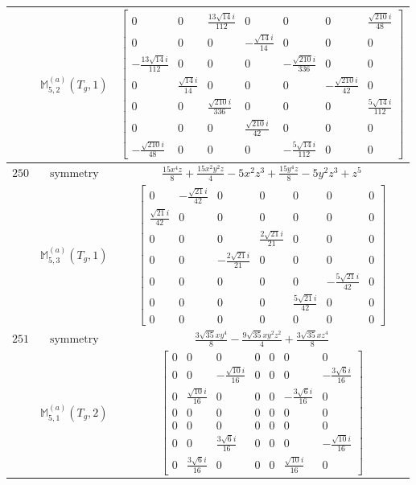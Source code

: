 \documentclass[fleqn,8pt,landscape]{jsarticle}
\begin{document}
\begin{longtable}{ccc}
$  $ & $ \mathbb{M}_{5,2}^{(a)}(T_{g},1) $ & $ \begin{bmatrix} 0 & 0 & \frac{13 \sqrt{14} i}{112} & 0 & 0 & 0 & \frac{\sqrt{210} i}{48} \\ 0 & 0 & 0 & - \frac{\sqrt{14} i}{14} & 0 & 0 & 0 \\ - \frac{13 \sqrt{14} i}{112} & 0 & 0 & 0 & - \frac{\sqrt{210} i}{336} & 0 & 0 \\ 0 & \frac{\sqrt{14} i}{14} & 0 & 0 & 0 & - \frac{\sqrt{210} i}{42} & 0 \\ 0 & 0 & \frac{\sqrt{210} i}{336} & 0 & 0 & 0 & \frac{5 \sqrt{14} i}{112} \\ 0 & 0 & 0 & \frac{\sqrt{210} i}{42} & 0 & 0 & 0 \\ - \frac{\sqrt{210} i}{48} & 0 & 0 & 0 & - \frac{5 \sqrt{14} i}{112} & 0 & 0 \end{bmatrix} $ \\ \hline
$ 250 $ & $ \text{symmetry} $ & $ \frac{15 x^{4} z}{8} + \frac{15 x^{2} y^{2} z}{4} - 5 x^{2} z^{3} + \frac{15 y^{4} z}{8} - 5 y^{2} z^{3} + z^{5} $ \\
$  $ & $ \mathbb{M}_{5,3}^{(a)}(T_{g},1) $ & $ \begin{bmatrix} 0 & - \frac{\sqrt{21} i}{42} & 0 & 0 & 0 & 0 & 0 \\ \frac{\sqrt{21} i}{42} & 0 & 0 & 0 & 0 & 0 & 0 \\ 0 & 0 & 0 & \frac{2 \sqrt{21} i}{21} & 0 & 0 & 0 \\ 0 & 0 & - \frac{2 \sqrt{21} i}{21} & 0 & 0 & 0 & 0 \\ 0 & 0 & 0 & 0 & 0 & - \frac{5 \sqrt{21} i}{42} & 0 \\ 0 & 0 & 0 & 0 & \frac{5 \sqrt{21} i}{42} & 0 & 0 \\ 0 & 0 & 0 & 0 & 0 & 0 & 0 \end{bmatrix} $ \\ \hline
$ 251 $ & $ \text{symmetry} $ & $ \frac{3 \sqrt{35} x y^{4}}{8} - \frac{9 \sqrt{35} x y^{2} z^{2}}{4} + \frac{3 \sqrt{35} x z^{4}}{8} $ \\
$  $ & $ \mathbb{M}_{5,1}^{(a)}(T_{g},2) $ & $ \begin{bmatrix} 0 & 0 & 0 & 0 & 0 & 0 & 0 \\ 0 & 0 & - \frac{\sqrt{10} i}{16} & 0 & 0 & 0 & - \frac{3 \sqrt{6} i}{16} \\ 0 & \frac{\sqrt{10} i}{16} & 0 & 0 & 0 & - \frac{3 \sqrt{6} i}{16} & 0 \\ 0 & 0 & 0 & 0 & 0 & 0 & 0 \\ 0 & 0 & 0 & 0 & 0 & 0 & 0 \\ 0 & 0 & \frac{3 \sqrt{6} i}{16} & 0 & 0 & 0 & - \frac{\sqrt{10} i}{16} \\ 0 & \frac{3 \sqrt{6} i}{16} & 0 & 0 & 0 & \frac{\sqrt{10} i}{16} & 0 \end{bmatrix} $ \\ \hline

\end{longtable}
\end{document}

